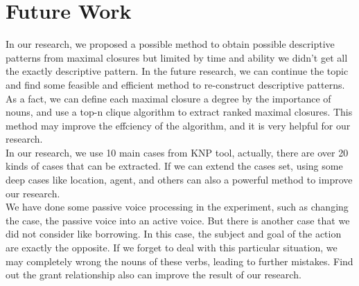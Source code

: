 \section{Future Work}
In our research, we proposed a possible method to obtain possible descriptive patterns from maximal closures but limited by time and ability we didn't get all the exactly descriptive pattern. In the future research, we can continue the topic and find some feasible and efficient method to re-construct descriptive patterns. \\
As a fact, we can define each maximal closure a degree by the importance of nouns, and use a top-n clique algorithm to extract ranked maximal closures. This method may improve the effciency of the algorithm, and it is very helpful for our research.\\
In our research, we use 10 main cases from KNP tool, actually, there are over 20 kinds of cases that can be extracted. If we can extend the cases set, using some deep cases like location, agent, and others can also a powerful method to improve our research.\\
We have done some passive voice processing in the experiment, such as changing the case, the passive voice into an active voice. But there is another case that we did not consider like borrowing. In this case, the subject and goal of the action are exactly the opposite. If we forget to deal with this particular situation, we may completely wrong the nouns of these verbs, leading to further mistakes. Find out the grant relationship also can improve the result of our research.